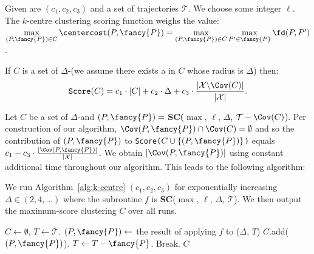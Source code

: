 \documentclass[english, thm-restate]{lipics-v2021}
\begin{document}
Given are $(c_1, c_2, c_3)$ and a set of trajectories $\mathcal{T}$. 
We choose some integer $\ell$. 
The $k$-centre clustering scoring function weighs the value:  $\max\limits_{(P, {\fancy{P}}) \in C} \centercost(P, {\fancy{P}}) = \max\limits_{(P, {\fancy{P}}) \in C} \max\limits_{P' \in {\fancy{P}}} \fd(P, P')$.
\vspace{0.5cm}

\noindent
If $C$ is a set of $\Delta$-\pathlets (we assume there exists a \pathlet in $C$ whose radius is $\Delta$) then:
\[
\texttt{Score}(C) =  c_1 \cdot |C| + c_2 \cdot \Delta + c_3 \cdot \frac{|\mathcal{X} \backslash \Cov(C) |}{|\mathcal{X}|}. 
\]


\noindent
Let $C$ be a set of $\Delta$-\pathlets and $(P, {\fancy{P}})=$ \textbf{SC(}$\max$, $\ell$, $\Delta$, $\mathcal{T} - \Cov(C)$).
Per construction of our algorithm, $\Cov(P, {\fancy{P}}) \cap \Cov(C) = \emptyset$ and so the contribution of  $(P, {\fancy{P}})$ to \texttt{Score($C \cup \{ (P, {\fancy{P}})\}$)} equals $c_1 - c_3 \cdot \frac{|\Cov(P, {\fancy{P}})|}{|\mathcal{X}|}$.
We obtain $|\Cov(P, {\fancy{P}})|$ using constant additional time throughout our algorithm.
This leads to the following algorithm:

\begin{algodef}
\label{algodef:k-centre-length}
    We run Algorithm~\ref{alg:k-centre} $(c_1, c_2, c_3)$ for exponentially increasing $\Delta \in (2, 4, \ldots )$  where the subroutine $f$ is \textbf{SC}($\max$, $\ell$, $\Delta$, $\mathcal{T}$). We then output the maximum-score clustering $C$ over all runs.
\end{algodef}








 \begin{algorithm}[h]
    \caption{\texttt{k\_centre}(\texttt{vector} $(c_1, c_2, c_3)$, \texttt{value} $\Delta$, \texttt{trajectory} $\mathcal{T}$, \texttt{subroutine} $f$) }
    \label{alg:k-centre}
    \begin{algorithmic}
    \State $C \gets \emptyset$, $T \gets \mathcal{T}$.
    \State $(P, {\fancy{P}}) \gets $ the result of applying $f$ to ($\Delta$, $T$)
    \State $C$.add($(P, {\fancy{P}})$).
    \State $T \gets T - {\fancy{P}}$.
    \Else
    \State Break.
    \EndIf
    \EndWhile
    \State \Return $C$
    \end{algorithmic}
  \end{algorithm}
\end{document}
